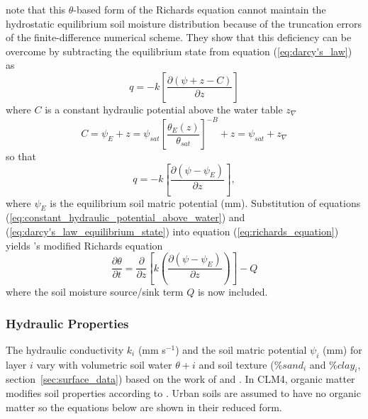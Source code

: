 \documentclass[12pt,authoryear]{elsarticle}
\numberwithin{equation}{section} %
\begin{document}
\cite{zengImprovingNumericalSolution2009} note that this $\theta$-based form of the Richards equation cannot maintain the hydrostatic equilibrium soil moisture distribution because of the truncation errors of the finite-difference numerical scheme. They show that this deficiency can be overcome by subtracting the equilibrium state from equation (\ref{eq:darcy's_law}) as 
\begin{equation}
\label{eq:darcy's_law_equilibrium_state}
q = -k \left[\frac{\partial (\psi+z-C)}{\partial z}\right]
\end{equation}
where $C$ is a constant hydraulic potential above the water table $z_{\nabla}$
\begin{equation}
\label{eq:constant_hydraulic_potential_above_water}
C=\psi_{E}+z=\psi_{sat}\left[\frac{\theta_{E}(z)}{\theta_{sat}}\right]^{-B} +z = \psi_{sat}+z_{\nabla}
\end{equation}
so that 
\begin{equation}
\label{eq:soil_water_flux_equilibrium_potential}
q = -k\left[\frac{\partial(\psi-\psi_{E})}{\partial z}\right],
\end{equation}
where $\psi_{E}$ is the equilibrium soil matric potential (mm). Substitution of equations (\ref{eq:constant_hydraulic_potential_above_water}) and (\ref{eq:darcy's_law_equilibrium_state}) into equation (\ref{eq:richards_equation}) yields \cite{zengImprovingNumericalSolution2009}'s modified Richards equation 
\begin{equation}
\frac{\partial \theta}{\partial t} = \frac{\partial}{\partial z}\left[k\left(\frac{\partial(\psi-\psi_{E})}{\partial z}\right)\right]-Q
\end{equation}
where the soil moisture source/sink term $Q$ is now included.

\subsubsection{Hydraulic Properties}
\label{sec:hydraulic_properties}
%
The hydraulic conductivity $k_{i}$ (mm s$^{-1}$) and the soil matric potential $\psi_{i}$ (mm) for layer $i$ vary with volumetric soil water $\theta+{i}$ and soil texture (\%$sand_{i}$ and \%$clay_{i}$, section~\ref{sec:surface_data}) based on the work of \cite{clappEmpiricalEquationsSoil1978} and \cite{cosbyStatisticalExplorationRelationships1984}. In
CLM4, organic matter modifies soil properties according to \cite{lawrenceIncorporatingOrganicSoil2008}. Urban soils are assumed to have no organic matter so the equations below are shown in their reduced form.
\end{document}
